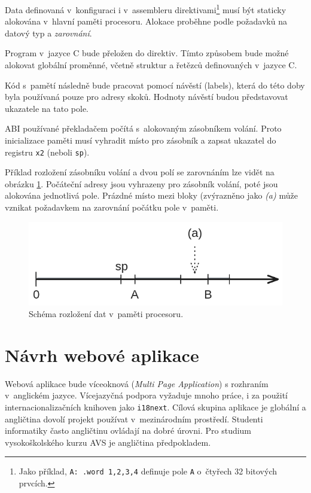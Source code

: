 Data definovaná v~konfiguraci i v~assembleru direktivami\footnote{Jako příklad, \texttt{A: .word 1,2,3,4} definuje pole \texttt{A} o~čtyřech 32 bitových prvcích.} musí být staticky alokována v~hlavní paměti procesoru.
Alokace proběhne podle požadavků na datový typ a \emph{zarovnání}.

Program v~jazyce C bude přeložen do direktiv.
Tímto způsobem bude možné alokovat globální proměnné, včetně struktur a řetězců definovaných v~jazyce C.

Kód s~pamětí následně bude pracovat pomocí návěstí (labels), která do této doby byla používaná pouze pro adresy skoků.
Hodnoty návěstí budou představovat ukazatele na tato pole.

ABI používané překladačem počítá s~alokovaným zásobníkem volání.
Proto inicializace paměti musí vyhradit místo pro zásobník a zapsat ukazatel do registru \texttt{x2} (neboli \texttt{sp}).

Příklad rozložení zásobníku volání a dvou polí se zarovnáním lze vidět na obrázku \ref{memlayout_schema}.
Počáteční adresy jsou vyhrazeny pro zásobník volání, poté jsou alokována jednotlivá pole.
Prázdné místo mezi bloky (zvýrazněno jako \emph{(a)} může vznikat požadavkem na zarovnání počátku pole v~paměti.

\begin{figure}[hbtp]
\centering
    \includegraphics[width=13cm]{obrazky-figures/memlayout.png}
    \caption{Schéma rozložení dat v~paměti procesoru.} 
    \label{memlayout_schema}
\end{figure}

\section{Návrh webové aplikace}
\label{webAppDesign}

Webová aplikace bude víceoknová (\emph{Multi Page Application}) s rozhraním v~anglickém jazyce.
Vícejazyčná podpora vyžaduje mnoho práce, i za použití internacionalizačních knihoven jako \texttt{i18next}.
Cílová skupina aplikace je globální a angličtina dovolí projekt používat v~mezinárodním prostředí. 
Studenti informatiky často angličtinu ovládají na dobré úrovni.
Pro studium vysokoškolského kurzu AVS je angličtina předpokladem.

